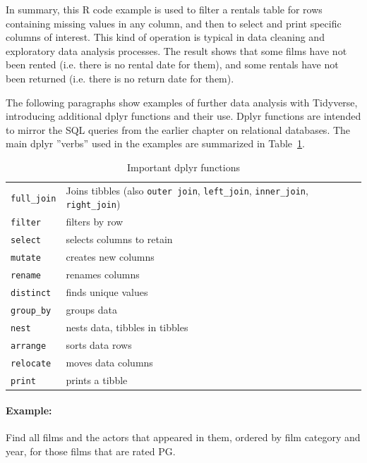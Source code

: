 In summary, this R code example is used to filter a rentals table for rows containing missing values in any column, and then to select and print specific columns of interest. This kind of operation is typical in data cleaning and exploratory data analysis processes. The result shows that some films have not been rented (i.e. there is no rental date for them), and some rentals have not been returned (i.e. there is no return date for them).

The following paragraphs show examples of further data analysis with Tidyverse, introducing additional dplyr functions and their use. Dplyr functions are intended to mirror the SQL queries from the earlier chapter on relational databases. The main dplyr ''verbs'' used in the examples are summarized in Table~\ref{tab:dplyr}. 

\begin{table}
\centering
\renewcommand{\arraystretch}{1.25}

\begin{tabularx}{\textwidth}{l|X} \hline
\texttt{full\_join} & Joins tibbles (also \texttt{outer join}, \texttt{left\_join}, \texttt{inner\_join}, \texttt{right\_join}) \\
\texttt{filter} & filters by row \\
\texttt{select} & selects columns to retain \\
\texttt{mutate} & creates new columns \\
\texttt{rename} & renames columns \\
\texttt{distinct} & finds unique values \\
\texttt{group\_by} & groups data \\
\texttt{nest} & nests data, tibbles in tibbles \\
\texttt{arrange} & sorts data rows \\
\texttt{relocate} & moves data columns \\
\texttt{print} & prints a tibble \\ \hline
\end{tabularx}
\caption{Important dplyr functions}
\label{tab:dplyr}
\end{table}


\paragraph*{Example:} Find all films and the actors that appeared in them, ordered by film category and year, for those films that are rated PG.

